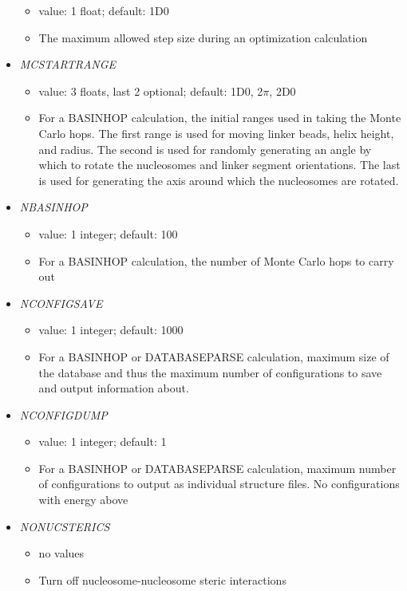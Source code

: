 \documentclass[12pt,dvips]{article}
\begin{document}
\begin{itemize}
\begin{itemize}
    \item value: 1 float; default: 1D0
    \item The maximum allowed step size during an optimization calculation
  \end{itemize}
%
\item {\it MCSTARTRANGE}
  \begin{itemize}
    \item value: 3 floats, last 2 optional; default: 1D0, 2$\pi$, 2D0
    \item For a BASINHOP calculation, the initial ranges used in taking the Monte Carlo hops. The first range is used for moving linker beads, helix height, and radius. The second is used for randomly generating an angle by which to rotate the nucleosomes and linker segment orientations. The last is used for generating the axis around which the nucleosomes are rotated.
  \end{itemize}
%
\item {\it NBASINHOP}
  \begin{itemize}
    \item value: 1 integer; default: 100
    \item For a BASINHOP calculation, the number of Monte Carlo hops to carry out
  \end{itemize}
%
\item {\it NCONFIGSAVE}
  \begin{itemize}
    \item value: 1 integer; default: 1000
    \item For a BASINHOP or DATABASEPARSE calculation, maximum size of the database and thus the maximum number of configurations to save and output information about. 
  \end{itemize}
%
\item {\it NCONFIGDUMP}
  \begin{itemize}
    \item value: 1 integer; default: 1
    \item For a BASINHOP or DATABASEPARSE calculation, maximum number of configurations to output as individual structure files. No configurations with energy above 
  \end{itemize}
%
\item {\it NONUCSTERICS}
  \begin{itemize}
    \item no values
    \item Turn off nucleosome-nucleosome steric interactions 
  \end{itemize}

\end{itemize}
\end{document}
